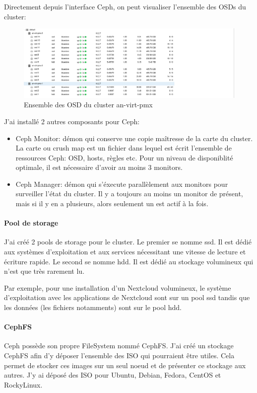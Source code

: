 \documentclass[12pt]{article}
\begin{document}
Directement depuis l'interface Ceph, on peut visualiser l'ensemble des OSDs du cluster:
\begin{figure}
    \centering
        \includegraphics[width=\textwidth]{src/osd_cluster.png}
    \caption{Ensemble des OSD du cluster an-virt-pmx}
    \label{fig:osd_cluster}
\end{figure}

J'ai installé 2 autres composants pour Ceph:
\begin{itemize}
    \item Ceph Monitor: démon qui conserve une copie maîtresse de la carte du cluster. 
    La carte ou crush map est un fichier dans lequel est écrit l'ensemble de ressources Ceph: OSD, hosts, règles etc.
    Pour un niveau de disponiblité optimale, il est nécessaire d'avoir au moins 3 monitors.
    \item Ceph Manager: démon qui s'éxecute parallèlement aux monitors pour surveiller l'état du cluster.
    Il y a toujours au moins un monitor de présent, mais si il y en a plusieurs, alors seulement un est actif à la fois.
\end{itemize}

\paragraph{Pool de storage}
J'ai créé 2 pools de storage pour le cluster.
Le premier se nomme ssd. 
Il est dédié aux systèmes d'exploitation et aux services nécessitant une vitesse de lecture et écriture rapide.
Le second se nomme hdd.
Il est dédié au stockage volumineux qui n'est que très rarement lu.

Par exemple, pour une installation d'un Nextcloud volumineux, le système d'exploitation avec les applications de Nextcloud sont sur un pool ssd tandis que les données (les fichiers notamments) sont sur le pool hdd.

\paragraph{CephFS}
Ceph possède son propre FileSystem nommé CephFS.
J'ai créé un stockage CephFS afin d'y déposer l'ensemble des ISO qui pourraient être utiles.
Cela permet de stocker ces images sur un seul noeud et de présenter ce stockage aux autres.
J'y ai déposé des ISO pour Ubuntu, Debian, Fedora, CentOS et RockyLinux.
\end{document}
